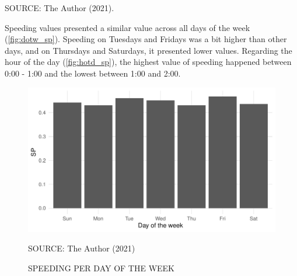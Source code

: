 \begin{table}[!htbp]
    \label{tab:speeding}
    \par \vspace{2mm} \footnotesize \raggedright
    SOURCE: The Author (2021).
\end{table}


Speeding values presented a similar value across all days of the week (\autoref{fig:dotw_sp}). Speeding on Tuesdays and Fridays was a bit higher than other days, and on Thursdays and Saturdays, it presented lower values. Regarding the hour of the day (\autoref{fig:hotd_sp}), the highest value of speeding happened between 0:00 - 1:00 and the lowest between 1:00 and 2:00. 

\begin{figure}[!htbp]
    \centering\footnotesize
    \captionsetup{font=footnotesize}
    \caption{SPEEDING PER DAY OF THE WEEK}
    \includegraphics{fig/dotw_sp.pdf}
    \label{fig:dotw_sp}
    \par SOURCE: The Author (2021)
\end{figure}

